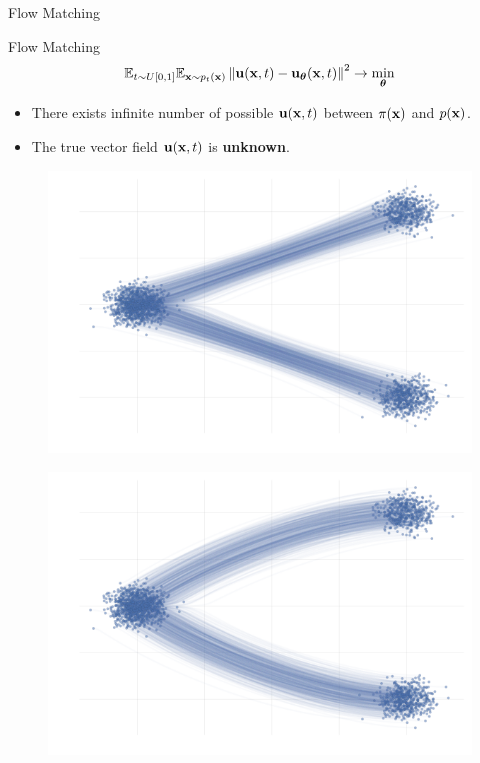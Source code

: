 \begin{frame}{Flow Matching}
	\begin{block}{Flow Matching}
		\[
			\mathbb{E}_{t \sim U[0, 1]} \mathbb{E}_{\mathbf{x} \sim p_t(\mathbf{x})}\left\| \mathbf{u}(\mathbf{x}, t) - \mathbf{u}_{\boldsymbol{\theta}}(\mathbf{x}, t) \right\|^2 \rightarrow \min_{\boldsymbol{\theta}}
		\]
	\end{block}
	\begin{itemize}
		\item There exists infinite number of possible $\mathbf{u}(\mathbf{x}, t)$ between $\pi(\mathbf{x})$ and $p(\mathbf{x})$.
		\item The true vector field  $\mathbf{u}(\mathbf{x}, t)$ is \textbf{unknown}.
	\end{itemize}
	\begin{minipage}[t]{0.5\columnwidth}
		\begin{figure}
			\centering
			\includegraphics[width=\linewidth]{figs/non_uniqueness1}
		\end{figure}
	\end{minipage}%
	\begin{minipage}[t]{0.5\columnwidth}
		\begin{figure}
			\centering
			\includegraphics[width=\linewidth]{figs/non_uniqueness2}
		\end{figure}
	\end{minipage}
\end{frame}
